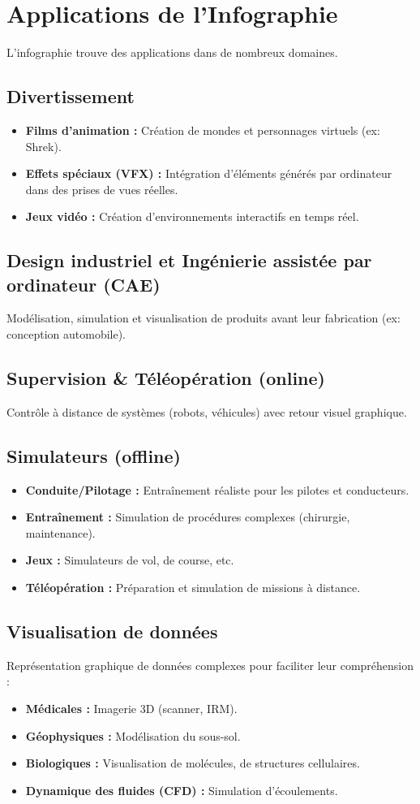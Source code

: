 \documentclass{article}
\begin{document}
\section{Applications de l'Infographie}
L'infographie trouve des applications dans de nombreux domaines.
\subsection{Divertissement}
\begin{itemize}
    \item \textbf{Films d'animation :} Création de mondes et personnages virtuels (ex: Shrek).
    \item \textbf{Effets spéciaux (VFX) :} Intégration d'éléments générés par ordinateur dans des prises de vues réelles.
    \item \textbf{Jeux vidéo :} Création d'environnements interactifs en temps réel.
\end{itemize}
\subsection{Design industriel et Ingénierie assistée par ordinateur (CAE)}
Modélisation, simulation et visualisation de produits avant leur fabrication (ex: conception automobile).
\subsection{Supervision \& Téléopération (online)}
Contrôle à distance de systèmes (robots, véhicules) avec retour visuel graphique.
\subsection{Simulateurs (offline)}
\begin{itemize}
    \item \textbf{Conduite/Pilotage :} Entraînement réaliste pour les pilotes et conducteurs.
    \item \textbf{Entraînement :} Simulation de procédures complexes (chirurgie, maintenance).
    \item \textbf{Jeux :} Simulateurs de vol, de course, etc.
    \item \textbf{Téléopération :} Préparation et simulation de missions à distance.
\end{itemize}
\subsection{Visualisation de données}
Représentation graphique de données complexes pour faciliter leur compréhension :
\begin{itemize}
    \item \textbf{Médicales :} Imagerie 3D (scanner, IRM).
    \item \textbf{Géophysiques :} Modélisation du sous-sol.
    \item \textbf{Biologiques :} Visualisation de molécules, de structures cellulaires.
    \item \textbf{Dynamique des fluides (CFD) :} Simulation d'écoulements.
\end{itemize}
\end{document}
